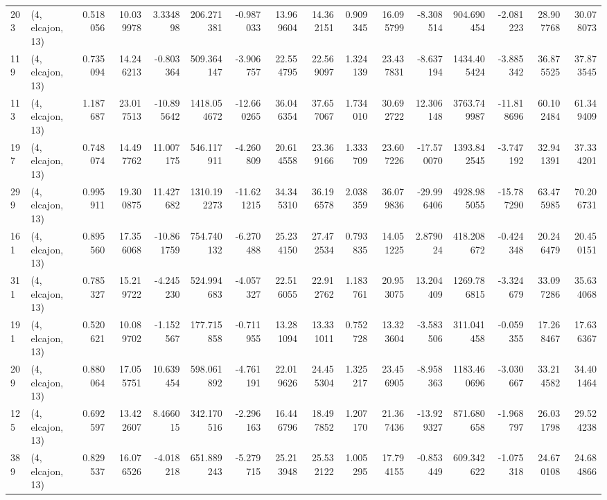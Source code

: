 \begin{tabular}{llrrrrrrrrrrrrrr}
203 &  (4, elcajon, 13) &   0.518056 &  10.039978 &   3.334898 &   206.271381 &  -0.987033 &  13.969604 &  14.362151 &  0.909345 &  16.095799 &  -8.308514 &   904.690454 &  -2.081223 &  28.907768 &  30.078073 \\
119 &  (4, elcajon, 13) &   0.735094 &  14.246213 &  -0.803364 &   509.364147 &  -3.906757 &  22.554795 &  22.569097 &  1.324139 &  23.437831 &  -8.637194 &  1434.405424 &  -3.885342 &  36.875525 &  37.873545 \\
113 &  (4, elcajon, 13) &   1.187687 &  23.017513 & -10.895642 &  1418.054672 & -12.660265 &  36.046354 &  37.657067 &  1.734010 &  30.692722 &  12.306148 &  3763.749987 & -11.818696 &  60.102484 &  61.349409 \\
197 &  (4, elcajon, 13) &   0.748074 &  14.497762 &  11.007175 &   546.117911 &  -4.260809 &  20.614558 &  23.369166 &  1.333709 &  23.607226 & -17.570070 &  1393.842545 &  -3.747192 &  32.941391 &  37.334201 \\
299 &  (4, elcajon, 13) &   0.995911 &  19.300875 &  11.427682 &  1310.192273 & -11.621215 &  34.345310 &  36.196578 &  2.038359 &  36.079836 & -29.996406 &  4928.985055 & -15.787290 &  63.475985 &  70.206731 \\
161 &  (4, elcajon, 13) &   0.895560 &  17.356068 & -10.861759 &   754.740132 &  -6.270488 &  25.234150 &  27.472534 &  0.793835 &  14.051225 &   2.879024 &   418.208672 &  -0.424348 &  20.246479 &  20.450151 \\
311 &  (4, elcajon, 13) &   0.785327 &  15.219722 &  -4.245230 &   524.994683 &  -4.057327 &  22.516055 &  22.912762 &  1.183761 &  20.953075 &  13.204409 &  1269.786815 &  -3.324679 &  33.097286 &  35.634068 \\
191 &  (4, elcajon, 13) &   0.520621 &  10.089702 &  -1.152567 &   177.715858 &  -0.711955 &  13.281094 &  13.331011 &  0.752728 &  13.323604 &  -3.583506 &   311.041458 &  -0.059355 &  17.268467 &  17.636367 \\
209 &  (4, elcajon, 13) &   0.880064 &  17.055751 &  10.639454 &   598.061892 &  -4.761191 &  22.019626 &  24.455304 &  1.325217 &  23.456905 &  -8.958363 &  1183.460696 &  -3.030667 &  33.214582 &  34.401464 \\
125 &  (4, elcajon, 13) &   0.692597 &  13.422607 &   8.466015 &   342.170516 &  -2.296163 &  16.446796 &  18.497852 &  1.207170 &  21.367436 & -13.929327 &   871.680658 &  -1.968797 &  26.031798 &  29.524238 \\
389 &  (4, elcajon, 13) &   0.829537 &  16.076526 &  -4.018218 &   651.889243 &  -5.279715 &  25.213948 &  25.532122 &  1.005295 &  17.794155 &  -0.853449 &   609.342622 &  -1.075318 &  24.670108 &  24.684866 \\

\end{tabular}
